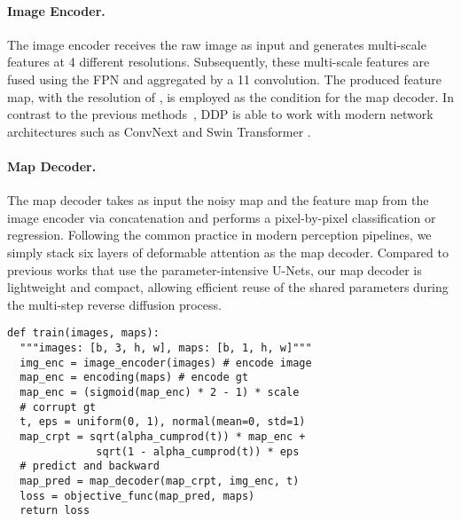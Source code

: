 \documentclass[10pt,twocolumn,letterpaper]{article}
\newcommand{\ours}[0]{DDP\xspace}
\begin{document}
\paragraph{Image Encoder.}
The image encoder receives the raw image  as input and generates multi-scale features at 4 different resolutions.
Subsequently, these multi-scale features are fused using the FPN \cite{lin2017feature} and aggregated by a 11 convolution.
The produced feature map, with the resolution of , is employed as the condition for the map decoder.
In contrast to the previous methods~\cite{amit2021segdiff, wu2022medsegdiff, saxena2023depthgen}, \ours is able to work with modern network architectures such as ConvNext \cite{liu2022convnet} and Swin Transformer \cite{liu2021swin}.


\paragraph{Map Decoder.}
The map decoder  takes as input the noisy map  and the feature map from the image encoder via concatenation and performs a pixel-by-pixel classification or regression.
Following the common practice \cite{cheng2022masked,zhu2020deformable,zhang2022dino} in modern perception pipelines, we simply stack six layers of deformable attention as the map decoder.
Compared to previous works \cite{amit2021segdiff, wu2022medsegdiff, saxena2023depthgen, chen2022generalist, wolleb2022diffusion} that use the parameter-intensive U-Nets, our map decoder is lightweight and compact, allowing efficient reuse of the shared parameters during the multi-step reverse diffusion process.


\begin{algorithm}[t!]
\caption{\ours Training}
\label{algo:ddp:training}
\lstset{language=Python}
\begin{lstlisting}[xleftmargin=-1em]
def train(images, maps):
  """images: [b, 3, h, w], maps: [b, 1, h, w]"""
  img_enc = image_encoder(images) # encode image
  map_enc = encoding(maps) # encode gt
  map_enc = (sigmoid(map_enc) * 2 - 1) * scale
  # corrupt gt
  t, eps = uniform(0, 1), normal(mean=0, std=1)
  map_crpt = sqrt(alpha_cumprod(t)) * map_enc +
              sqrt(1 - alpha_cumprod(t)) * eps
  # predict and backward
  map_pred = map_decoder(map_crpt, img_enc, t)
  loss = objective_func(map_pred, maps)
  return loss
\end{lstlisting}
\end{algorithm}
\end{document}
